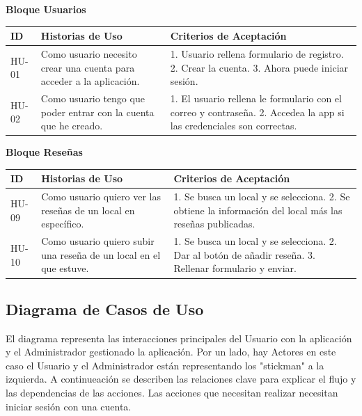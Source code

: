 \documentclass[a4paper,11pt]{article}
\begin{document}
\textbf{Bloque Usuarios}
\begin{table}[h]
    \centering
    \begin{tabular}{|p{1.5cm}|p{5cm}|p{8cm}|}
    \hline
    ID & Historias de Uso & Criterios de Aceptación \\ \hline
    HU-01 & Como usuario necesito crear una cuenta para acceder a la aplicación. & 1. Usuario rellena formulario de registro. 2. Crear la cuenta. 3. Ahora puede iniciar sesión.\\ \hline
    HU-02 & Como usuario tengo que poder entrar con la cuenta que he creado.  & 1. El usuario rellena le formulario con el correo y contraseña. 2. Accedea la app si las credenciales son correctas. \\ \hline
    \end{tabular}
\end{table}

\textbf{Bloque Reseñas}
\begin{table}[h]
    \centering
    \begin{tabular}{|p{1.5cm}|p{5cm}|p{8cm}|}
    \hline
    ID & Historias de Uso & Criterios de Aceptación \\ \hline
    HU-09 & Como usuario quiero ver las reseñas de un local en específico. & 1. Se busca un local y se selecciona. 2. Se obtiene la información del local más las reseñas publicadas.\\ \hline
    HU-10 & Como usuario quiero subir una reseña de un local en el que estuve.  & 1. Se busca un local y se selecciona. 2. Dar al botón de añadir reseña. 3. Rellenar formulario y enviar. \\ \hline
    \end{tabular}
\end{table}

\vspace{0.5cm}
\subsection{Diagrama de Casos de Uso}

El diagrama representa las interacciones principales del Usuario con la aplicación y el Administrador gestionado la aplicación. Por un lado, hay Actores en este caso el Usuario y el Administrador están representando los "stickman" a la izquierda. A continueación se describen las relaciones clave para explicar el flujo y las dependencias de las acciones. Las acciones que necesitan realizar necesitan iniciar sesión con una cuenta. 
\end{document}
